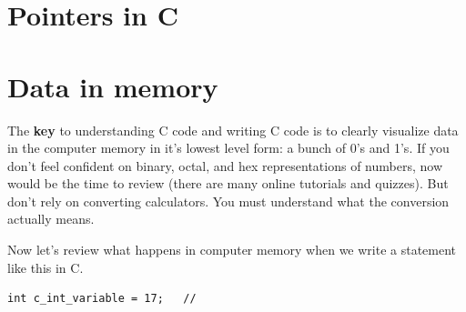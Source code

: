 %
%
%
%
%
%
%
%
%
\section*{Pointers in C}	%
%
\section{Data in memory}

The {\bf key} to understanding C code and writing C code is to clearly visualize data in the computer memory in it's lowest level form: 
a bunch of 0's and 1's.  
If you don't feel confident on binary, octal, and hex representations	%
of numbers, now would be the time to review (there are many  online tutorials and quizzes). 
But don't rely on converting calculators.  You must understand what the conversion actually means. 

Now let's review what happens in computer memory when we write a statement like this in C.
\begin{verbatim}
int c_int_variable = 17;   // 
\end{verbatim}

